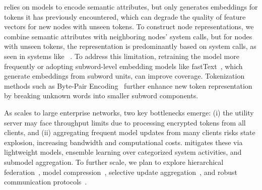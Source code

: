 
 \Sys relies on \wordvec models to encode semantic attributes, but \wordvec only generates embeddings for tokens it has previously encountered, which can degrade the quality of feature vectors for new nodes with unseen tokens. To construct node representations, we combine semantic attributes with neighboring nodes' system calls, but for nodes with unseen tokens, the representation is predominantly based on system calls, as seen in systems like \threatrace~\cite{wang2022threatrace}. To address this limitation, retraining the \wordvec model more frequently or adopting subword-level embedding models like fastText~\cite{joulin2016bag}, which generate embeddings from subword units, can improve coverage. Tokenization methods such as Byte-Pair Encoding~\cite{araabi2022effective} further enhance new token representation by breaking unknown words into smaller subword components.

As \Sys scales to large enterprise networks, two key bottlenecks emerge: (i) the utility server may face throughput limits due to processing encrypted tokens from all clients, and (ii) aggregating frequent model updates from many clients risks state explosion, increasing bandwidth and computational costs. \Sys mitigates these via lightweight models, ensemble learning over categorized system activities, and submodel aggregation. To further scale, we plan to explore hierarchical federation~\cite{zhong2022flee}, model compression~\cite{choudhary2020comprehensive}, selective update aggregation~\cite{ye2020federated}, and robust communication protocols~\cite{laclau2020robust}.


